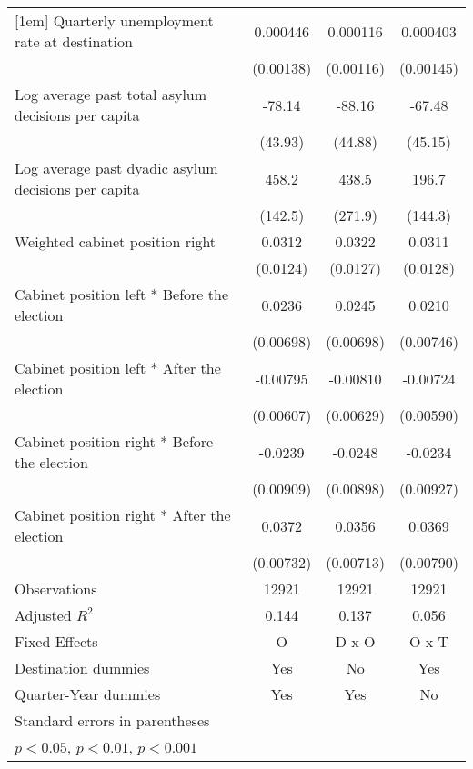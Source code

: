 \begin{table}[htbp]
\begin{tabular}{l*{3}{c}}
[1em]
Quarterly unemployment rate at destination&    0.000446         &    0.000116         &    0.000403         \\
                    &   (0.00138)         &   (0.00116)         &   (0.00145)         \\
[1em]
Log average past total asylum decisions per capita&      -78.14         &      -88.16         &      -67.48         \\
                    &     (43.93)         &     (44.88)         &     (45.15)         \\
[1em]
Log average past dyadic asylum decisions per capita&       458.2\sym{**} &       438.5         &       196.7         \\
                    &     (142.5)         &     (271.9)         &     (144.3)         \\
[1em]
Weighted cabinet position right&      0.0312\sym{*}  &      0.0322\sym{*}  &      0.0311\sym{*}  \\
                    &    (0.0124)         &    (0.0127)         &    (0.0128)         \\
[1em]
Cabinet position left * Before the election&      0.0236\sym{**} &      0.0245\sym{***}&      0.0210\sym{**} \\
                    &   (0.00698)         &   (0.00698)         &   (0.00746)         \\
[1em]
Cabinet position left * After the election&    -0.00795         &    -0.00810         &    -0.00724         \\
                    &   (0.00607)         &   (0.00629)         &   (0.00590)         \\
[1em]
Cabinet position right * Before the election&     -0.0239\sym{*}  &     -0.0248\sym{**} &     -0.0234\sym{*}  \\
                    &   (0.00909)         &   (0.00898)         &   (0.00927)         \\
[1em]
Cabinet position right * After the election&      0.0372\sym{***}&      0.0356\sym{***}&      0.0369\sym{***}\\
                    &   (0.00732)         &   (0.00713)         &   (0.00790)         \\
\hline
Observations        &       12921         &       12921         &       12921         \\
Adjusted \(R^{2}\)  &       0.144         &       0.137         &       0.056         \\
Fixed Effects       &           O         &       D x O         &       O x T         \\
Destination dummies &         Yes         &          No         &         Yes         \\
Quarter-Year dummies&         Yes         &         Yes         &          No         \\
\hline\hline
\multicolumn{4}{l}{\footnotesize Standard errors in parentheses}\\
\multicolumn{4}{l}{\footnotesize \sym{*} \(p<0.05\), \sym{**} \(p<0.01\), \sym{***} \(p<0.001\)}\\
\end{tabular}
\end{table}
